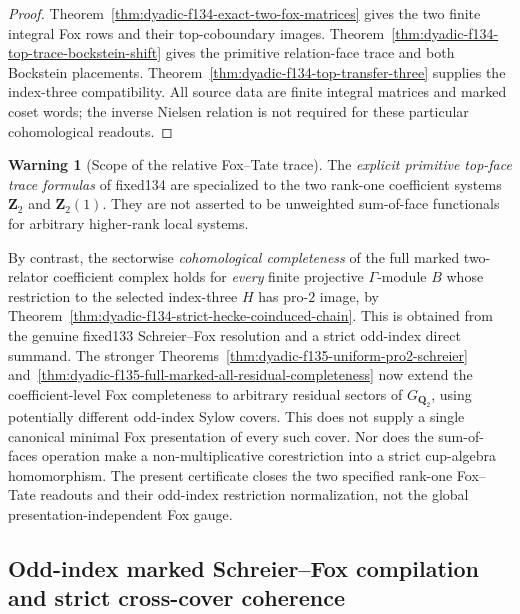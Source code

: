 \documentclass[11pt]{article}
\theoremstyle{definition}
\newtheorem{warning}[theorem]{Warning}
\begin{document}
\begin{proof}
Theorem~\ref{thm:dyadic-f134-exact-two-fox-matrices}
gives the two
finite integral
Fox rows and their
top-coboundary
images.
Theorem~\ref{thm:dyadic-f134-top-trace-bockstein-shift}
gives the primitive
relation-face
trace and both
Bockstein placements.
Theorem~\ref{thm:dyadic-f134-top-transfer-three}
supplies the
index-three
compatibility.
All source data
are finite
integral matrices
and marked
coset words;
the inverse
Nielsen relation
is not required
for these
particular
cohomological
readouts.
\end{proof}

\begin{warning}[Scope of the relative Fox--Tate trace]
\label{warn:dyadic-f134-rankone-trace-scope}
The \emph{explicit
primitive top-face
trace formulas}
of fixed134
are specialized
to the two
rank-one
coefficient
systems
$\mathbf Z_2$
and
$\mathbf Z_2(1)$.
They are not
asserted to
be unweighted
sum-of-face
functionals
for arbitrary
higher-rank
local systems.

By contrast,
the sectorwise
\emph{cohomological
completeness}
of the full
marked
two-relator
coefficient
complex holds
for \emph{every}
finite projective
$\Gamma$-module
$B$ whose
restriction to
the selected
index-three
$H$ has
pro-$2$ image,
by
Theorem~\ref{thm:dyadic-f134-strict-hecke-coinduced-chain}.
This is obtained
from the
genuine fixed133
Schreier--Fox
resolution and
a strict
odd-index
direct summand.
The stronger
Theorems~\ref{thm:dyadic-f135-uniform-pro2-schreier}
and~\ref{thm:dyadic-f135-full-marked-all-residual-completeness}
now extend the
coefficient-level
Fox completeness
to arbitrary
residual sectors
of $G_{\mathbf Q_2}$,
using potentially
different odd-index
Sylow covers.
This does not
supply a single
canonical minimal
Fox presentation
of every such cover.
Nor does the
sum-of-faces
operation
make a
non-multiplicative
corestriction
into a
strict
cup-algebra
homomorphism.
The present
certificate
closes the
two specified
rank-one
Fox--Tate
readouts
and their
odd-index
restriction
normalization,
not the
global
presentation-independent
Fox gauge.
\end{warning}


\subsection{Odd-index marked Schreier--Fox compilation and
strict cross-cover coherence}
\label{subsec:dyadic-f135-odd-sylow-compiler}
\end{document}
